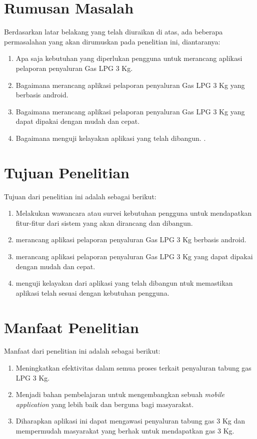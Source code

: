 \newpage
\section{Rumusan Masalah}
Berdasarkan latar belakang yang telah diuraikan di atas, ada beberapa permasalahan yang akan dirumuskan pada penelitian ini, diantaranya:
\begin{enumerate}
	\item Apa saja kebutuhan yang diperlukan pengguna untuk merancang aplikasi pelaporan penyaluran Gas LPG 3 Kg.
	\item Bagaimana merancang aplikasi pelaporan penyaluran Gas LPG 3 Kg yang berbasis android.
	\item Bagaimana merancang aplikasi pelaporan penyaluran Gas LPG 3 Kg yang dapat dipakai dengan mudah dan cepat.
	\item Bagaimana menguji kelayakan aplikasi yang telah dibangun.
	.
\end{enumerate}

\section{Tujuan Penelitian}
Tujuan dari penelitian ini adalah sebagai berikut:
\begin{enumerate}
	\item Melakukan wawancara atau survei kebutuhan pengguna untuk mendapatkan fitur-fitur dari sistem yang akan dirancang dan dibangun.
	\item merancang aplikasi pelaporan penyaluran Gas LPG 3 Kg berbasis android.
	\item merancang aplikasi pelaporan penyaluran Gas LPG 3 Kg yang dapat dipakai dengan mudah dan cepat.
	\item menguji kelayakan dari aplikasi yang telah dibangun ntuk memastikan aplikasi telah sesuai dengan kebutuhan pengguna.
\end{enumerate}


\section{Manfaat Penelitian}
Manfaat dari penelitian ini adalah sebagai berikut:
\begin{enumerate}
	\item Meningkatkan efektivitas dalam semua proses terkait penyaluran tabung gas LPG 3 Kg.
	\item Menjadi bahan pembelajaran untuk mengembangkan sebuah \textit{mobile application} yang lebih baik dan berguna bagi masyarakat.
	\item Diharapkan aplikasi ini dapat mengawasi penyaluran tabung gas 3 Kg dan mempermudah masyarakat yang berhak untuk mendapatkan gas 3 Kg.
\end{enumerate}


\begin{comment}

\end{comment}
